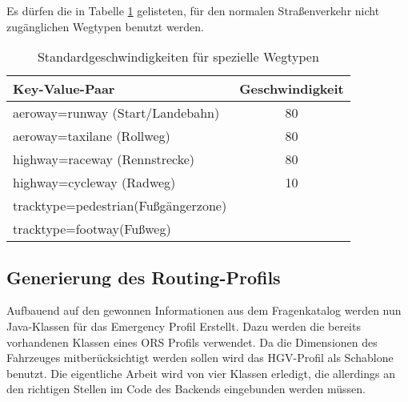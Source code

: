 Es dürfen die in Tabelle \ref{tab:speedinfospecial} gelisteten, für den normalen Straßenverkehr nicht zugänglichen Wegtypen benutzt werden.

\begin{table}
\caption{Standardgeschwindigkeiten für spezielle Wegtypen}
\label{tab:speedinfospecial}
\centering
\begin{tabular}{|l|c|}
\hline
\multicolumn{1}{|l|}{Key-Value-Paar} & \multicolumn{1}{c|}{Geschwindigkeit} \\
\hline
aeroway=runway (Start/Landebahn) & 80 \\
aeroway=taxilane (Rollweg) & 80 \\
highway=raceway (Rennstrecke) & 80 \\
highway=cycleway (Radweg) & 10 \\
tracktype=pedestrian(Fußgängerzone) & \\
tracktype=footway(Fußweg) & \\
\hline
\end{tabular}
\end{table}



\subsection{Generierung des Routing-Profils}
\label{backendGraphBuild}

Aufbauend auf den gewonnen Informationen aus dem Fragenkatalog werden nun Java-Klassen für das Emergency Profil Erstellt. Dazu werden die bereits vorhandenen Klassen eines ORS Profils verwendet.
Da die Dimensionen des Fahrzeuges mitberücksichtigt werden sollen wird das HGV-Profil als Schablone benutzt.
Die eigentliche Arbeit wird von vier Klassen erledigt, die allerdings an den richtigen Stellen im Code des Backends eingebunden werden müssen.

% 

